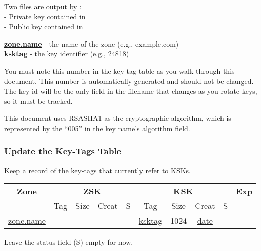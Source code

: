 Two files are output by : \\
    - Private key contained in \\
    - Public key contained in 

{\bf \underline{zone.name}} - the name of the zone (e.g., example.com)\\
{\bf \underline{ksktag}} - the key identifier (e.g., 24818) 

You must note this number in the key-tag table as you walk through this
document.  This number is automatically generated and should not be changed.
The key id will be the only field in the filename that changes as you rotate
keys, so it must be tracked.

This document uses RSASHA1 as the cryptographic algorithm, which is
represented by the ``005'' in the key name's algorithm field.


\subsubsection{Update the Key-Tags Table}

Keep a record of the key-tags that currently refer to KSKs.

\begin{center}
\begin{tabular}{|c|c|c|c|c|c|c|c|c|c|}
\hline
{\bf Zone} &
\multicolumn{4}{c|}{{\bf ZSK}} &
\multicolumn{4}{c|}{{\bf KSK}} &
{\bf Exp} \\
\cline{2-9}

 & Tag & Size & Creat & S & Tag & Size & Creat & S & \\
\hline

\underline{zone.name} & & & & & \underline{ksktag} & 1024 & \underline{date} & & \\

\hline
\end{tabular}
\end{center}

Leave the status field (S) empty for now.




